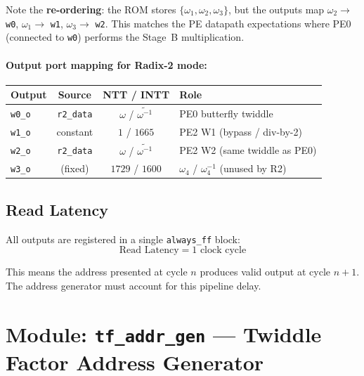 \documentclass[11pt,a4paper]{article}
\newcommand{\sv}[1]{\texttt{#1}}
\newcommand{\port}[1]{\texttt{#1}}
\begin{document}
Note the \textbf{re-ordering}: the ROM stores $\{\omega_1, \omega_2, \omega_3\}$, but the outputs map $\omega_2 \to$ \port{w0}, $\omega_1 \to$ \port{w1}, $\omega_3 \to$ \port{w2}. This matches the PE datapath expectations where PE0 (connected to \port{w0}) performs the Stage~B multiplication.

\paragraph{Output port mapping for Radix-2 mode:}

\begin{center}
\renewcommand{\arraystretch}{1.2}
\begin{tabular}{lccl}
\toprule
\textbf{Output} & \textbf{Source} & \textbf{NTT / INTT} & \textbf{Role} \\
\midrule
\port{w0\_o} & \texttt{r2\_data} & $\omega$ / $\widetilde{\omega^{-1}}$ & PE0 butterfly twiddle \\
\port{w1\_o} & constant & $1$ / $1665$ & PE2 W1 (bypass / div-by-2) \\
\port{w2\_o} & \texttt{r2\_data} & $\omega$ / $\widetilde{\omega^{-1}}$ & PE2 W2 (same twiddle as PE0) \\
\port{w3\_o} & (fixed) & $1729$ / $1600$ & $\omega_4$ / $\omega_4^{-1}$ (unused by R2) \\
\bottomrule
\end{tabular}
\end{center}

\subsection{Read Latency}

All outputs are registered in a single \sv{always\_ff} block:
\begin{equation}
  \text{Read Latency} = 1 \text{ clock cycle}
\end{equation}

This means the address presented at cycle $n$ produces valid output at cycle $n+1$. The address generator must account for this pipeline delay.

\section{Module: \sv{tf\_addr\_gen} --- Twiddle Factor Address Generator}
\label{sec:tf-addr-gen-module}
\end{document}

